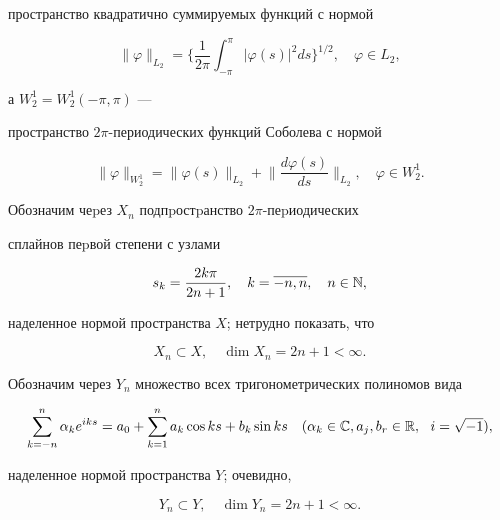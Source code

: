 пространство квадратично суммируемых функций с нормой


$$


\| \varphi \|_{L_2}=\bigg\{ \frac{1}{2\pi} \int_{- \pi}^{\pi} |


\varphi (s)|^2 ds \bigg\}^{1/2}, \quad \varphi \in L_2,


$$


а $W_{2}^{1}=W_{2}^{1}(-\pi, \pi)$ --- 


пространство $2 \pi$-периодических функций Соболева с нормой


$$


\|\varphi\|_{W_{2}^{1}}=\|\varphi(s)\|_{L_2}+


\bigg\|\frac{d\varphi(s)}{ds}\bigg\|_{L_2}, \quad \varphi \in W_{2}^{1}.


$$





Обозначим чеpез $X_{n}$ подпpостpанство $2\pi$-пеpиодических 


сплайнов пеpвой степени с узлами


\begin{equation}


s_{k}=\frac{2k \pi}{2n+1}, \quad k=\overline{-n,n}, \quad n \in \N,


\end{equation}


наделенное нормой пространства $X$; нетрудно показать, что


\begin{equation}


X_n \subset X, \quad \dim X_n=2n+1 < \infty.


\end{equation}


Обозначим через $Y_n$ множество всех тригонометрических полиномов вида


$$


\sum\limits_{k=-n}^{n} \alpha_{k}e^{iks}=a_0+


\sum\limits_{k=1}^{n} a_{k} \cos ks+b_{k} \sin ks


\quad (\alpha_{k}\in\Bbb C, a_{j}, b_{r} \in \R,\ \ i=\sqrt{-1}),


$$


наделенное нормой пространства $Y$; очевидно, 


\begin{equation}


Y_n \subset Y, \quad \dim Y_n=2n+1 < \infty.


\end{equation}


